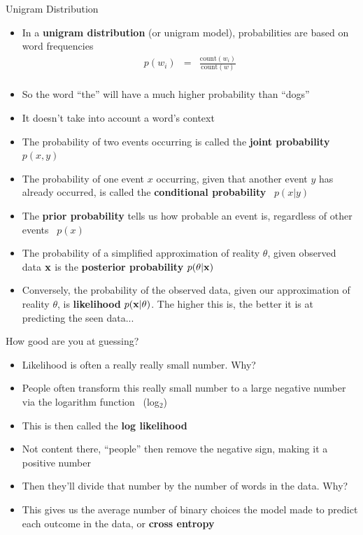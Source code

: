 \documentclass{beamer}
\newcommand{\detail}[1]{{\color{lightgrey}\small{}#1}}
\begin{document}
\begin{frame}{Unigram Distribution}
\begin{itemize}
	\item In a \textbf{unigram distribution} (or unigram model), probabilities are based on word frequencies
	\pause
	\begin{eqnarray*}
	 p(w_i) & = & \frac{\text{count}(w_i)}{\text{count}(w)} \\
	\end{eqnarray*}
	\vspace*{-2.0em}
	\pause
	\item So the word ``the'' will have a much higher probability than ``dogs''
	\pause
	\item It doesn't take into account a word's context
\end{itemize}
\end{frame}


\begin{frame}{}
\begin{itemize}
	\item The probability of two events occurring is called the \textbf{joint probability} \ \detail{$p(x,y)$}
	\pause
	\item The probability of one event \detail{$x$} occurring, given that another event \detail{$y$} has already occurred, is called the \textbf{conditional probability} \ \detail{$p(x|y)$}
	\pause
	\item The \textbf{prior probability} tells us how probable an event is, regardless of other events \ \detail{$p(x)$}
	\pause
	\item The probability of a simplified approximation of reality \detail{$\theta$}, given observed data \detail{$\bf x$} is
	the \textbf{posterior probability} \detail{$p(\theta|\bf{x})$}
	\pause
	\item Conversely, the probability of the observed data, given our approximation of reality \detail{$\theta$}, is \textbf{likelihood} \detail{$p(\bf{x}|\theta)$}.  \pause The higher this is, the better it is at predicting the seen data...
\end{itemize}
\end{frame}

\begin{frame}{How good are you at guessing?}
\begin{itemize}
	\item Likelihood is often a really really small number.  Why?
	\pause
	\item People often transform this really small number to a large negative number via the logarithm function \ \detail{(log$_2$)}
	\item This is then called the \textbf{log likelihood}
	\pause
	\item Not content there, ``people'' then remove the negative sign, making it a positive number
	\item Then they'll divide that number by the number of words in the data.  Why?
	\pause
	\item This gives us the average number of binary choices the model made to predict each outcome in the data, or \textbf{cross entropy}
\end{itemize}
\end{frame}
\end{document}

